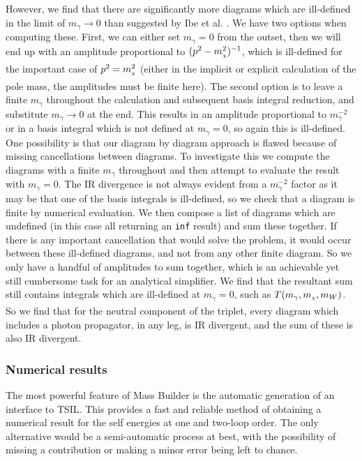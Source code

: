 \documentclass[11pt]{article}
\newcommand{\mychi}{\raisebox{0pt}[1ex][1ex]{\tiny$\chi$}}
\def\mc{m_{\mychi}}
\newcommand{\mb}{\textsf{Mass Builder} }
\newcommand{\tsils}{\textsf{TSIL}}
\begin{document}
However, we find that there are significantly more diagrams which are ill-defined in the limit of $m_{\gamma}\rightarrow 0$ than suggested by Ibe et al. \cite{Ibe2013a}.  We have two options when computing these.  First, we can either set $m_{\gamma}=0$ from the outset, then we will end up with an amplitude proportional to $(p^2-\mc^2)^{-1}$, which is ill-defined for the important case of $p^2=\mc^2$ (either in the implicit or explicit calculation of the pole mass, the amplitudes must be finite here).  The second option is to leave a finite $m_{\gamma}$ throughout the calculation and subsequent basis integral reduction, and substitute $m_{\gamma}\rightarrow 0$ at the end.  This results in an amplitude proportional to $m_{\gamma}^{-2}$ or in a basis integral which is not defined at $m_{\gamma}=0$, so again this is ill-defined.\\

One possibility is that our diagram by diagram approach is flawed because of missing cancellations between diagrams.  To investigate this we compute the diagrams with a finite $m_{\gamma}$ throughout and then attempt to evaluate the result with $m_{\gamma}=0$.  The IR divergence is not always evident from a $m_{\gamma}^{-2}$ factor as it may be that one of the basis integrals is ill-defined, so we check that a diagram is finite by numerical evaluation.  We then compose a list of diagrams which are undefined (in this case all returning an \lstinline{inf} result) and sum these together.  If there is any important cancellation that would solve the problem, it would occur between these ill-defined diagrams, and not from any other finite diagram.  So we only have a handful of amplitudes to sum together, which is an achievable yet still cumbersome task for an analytical simplifier.  We find that the resultant sum still contains integrals which are ill-defined at $m_{\gamma}=0$, such as $T(m_{\gamma},\mc,m_W)$.\\

So we find that for the neutral component of the triplet, every diagram which includes a photon propagator, in any leg, is IR divergent, and the sum of these is also IR divergent.


\subsubsection{Numerical results}

The most powerful feature of \mb is the automatic generation of an interface to \tsils.  This provides a fast and reliable method of obtaining a numerical result for the self energies at one and two-loop order.  The only alternative would be a semi-automatic process at best, with the possibility of missing a contribution or making a minor error being left to chance.\\
\end{document}
